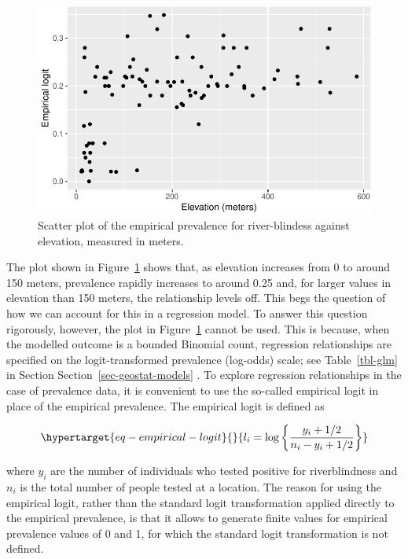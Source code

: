 \documentclass[
  letterpaper,
]{krantz}
\begin{document}
\begin{figure}[H]

{\centering \includegraphics{03_model-fitting_files/figure-pdf/fig-prev-elev-liberia-1.pdf}

}

\caption{\label{fig-prev-elev-liberia}Scatter plot of the empirical
prevalence for river-blindess against elevation, measured in meters.}

\end{figure}

The plot shown in Figure~\ref{fig-prev-elev-liberia} shows that, as
elevation increases from 0 to around 150 meters, prevalence rapidly
increases to around 0.25 and, for larger values in elevation than 150
meters, the relationship levels off. This begs the question of how we
can account for this in a regression model. To answer this question
rigorously, however, the plot in Figure~\ref{fig-prev-elev-liberia}
cannot be used. This is because, when the modelled outcome is a bounded
Binomial count, regression relationships are specified on the
logit-transformed prevalence (log-odds) scale; see Table~\ref{tbl-glm}
in Section Section~\ref{sec-geostat-models} . To explore regression
relationships in the case of prevalence data, it is convenient to use
the so-called empirical logit in place of the empirical prevalence. The
empirical logit is defined as

\begin{equation}\protect\hypertarget{eq-empirical-logit}{}{
l_{i} = \log\left\{\frac{y_i + 1/2}{n_i - y_i + 1/2}\right\}
}\label{eq-empirical-logit}\end{equation}

where \(y_i\) are the number of individuals who tested positive for
riverblindness and \(n_i\) is the total number of people tested at a
location. The reason for using the empirical logit, rather than the
standard logit transformation applied directly to the empirical
prevalence, is that it allows to generate finite values for empirical
prevalence values of 0 and 1, for which the standard logit
transformation is not defined.
\end{document}
